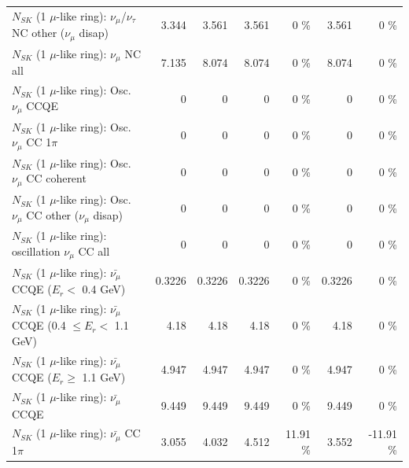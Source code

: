 \begin{table}
\begin{tabular}{| l | r | r | r  r | r  r |}
   $N_{SK}$ (1 $\mu$-like ring): $\nu_\mu$/$\nu_\tau$ NC other ($\nu_\mu$ disap) &           3.344 &           3.561 &           3.561 &        0 \%  &           3.561 &        0 \%  \\ 
                                $N_{SK}$ (1 $\mu$-like ring): $\nu_{\mu}$ NC all &           7.135 &           8.074 &           8.074 &        0 \%  &           8.074 &        0 \%  \\ 
\hline
\hline
                               $N_{SK}$ (1 $\mu$-like ring): Osc. $\nu_\mu$ CCQE &               0 &               0 &               0 &        0 \%  &               0 &        0 \%  \\ 
                          $N_{SK}$ (1 $\mu$-like ring): Osc. $\nu_\mu$ CC 1$\pi$ &               0 &               0 &               0 &        0 \%  &               0 &        0 \%  \\ 
                        $N_{SK}$ (1 $\mu$-like ring): Osc. $\nu_\mu$ CC coherent &               0 &               0 &               0 &        0 \%  &               0 &        0 \%  \\ 
         $N_{SK}$ (1 $\mu$-like ring): Osc. $\nu_\mu$ CC other ($\nu_\mu$ disap) &               0 &               0 &               0 &        0 \%  &               0 &        0 \%  \\ 
                      $N_{SK}$ (1 $\mu$-like ring): oscillation $\nu_\mu$ CC all &               0 &               0 &               0 &        0 \%  &               0 &        0 \%  \\ 
\hline
\hline
          $N_{SK}$ (1 $\mu$-like ring): $\bar{\nu_\mu}$ CCQE ($E_{r} <$ 0.4 GeV) &          0.3226 &          0.3226 &          0.3226 &        0 \%  &          0.3226 &        0 \%  \\ 
 $N_{SK}$ (1 $\mu$-like ring): $\bar{\nu_\mu}$ CCQE (0.4 $\leq E_{r} <$ 1.1 GeV) &            4.18 &            4.18 &            4.18 &        0 \%  &            4.18 &        0 \%  \\ 
       $N_{SK}$ (1 $\mu$-like ring): $\bar{\nu_\mu}$ CCQE ($E_{r} \geq$ 1.1 GeV) &           4.947 &           4.947 &           4.947 &        0 \%  &           4.947 &        0 \%  \\ 
\hline
                              $N_{SK}$ (1 $\mu$-like ring): $\bar{\nu_\mu}$ CCQE &           9.449 &           9.449 &           9.449 &        0 \%  &           9.449 &        0 \%  \\ 
                         $N_{SK}$ (1 $\mu$-like ring): $\bar{\nu_\mu}$ CC 1$\pi$ &           3.055 &           4.032 &           4.512 &    11.91 \%  &           3.552 &   -11.91 \%  \\ 

\end{tabular}
\end{table}
